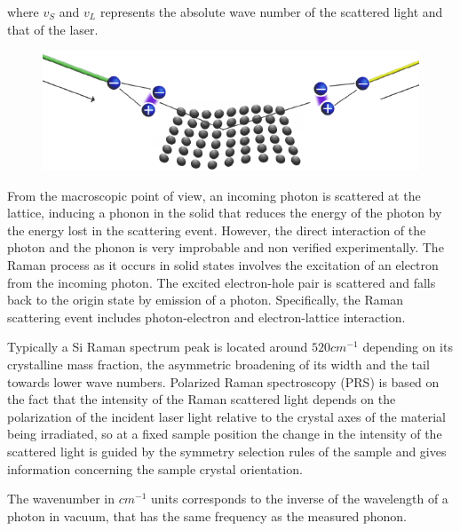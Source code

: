 \documentclass[openany,11pt,a4paper]{report}
\begin{document}
where $v_{S}$ and $v_{L}$ represents the absolute wave number of the scattered light and that of the laser.

\begin{figure}[H]
\centering
\includegraphics[scale=0.8]{solid.PNG}
\caption{\cite{phonons}}
\end{figure}



From the macroscopic point of view, an incoming photon is scattered at the lattice, inducing a phonon in the solid that reduces the energy of the photon by the energy lost in the scattering event. However, the direct interaction of the photon and the phonon is very improbable and non verified experimentally. The Raman process as it occurs in solid states involves the excitation of an electron from the incoming photon. The excited electron-hole pair is scattered and falls back to the origin state by
emission of a photon. Specifically, the Raman scattering event includes photon-electron and electron-lattice interaction. 


\cite{phonons}










Typically a Si Raman spectrum peak is located around $520 cm^{-1}$ depending on its
crystalline mass fraction, the asymmetric broadening of its width and the tail towards lower wave
numbers. Polarized Raman spectroscopy (PRS) is based on the
fact that the intensity of the Raman scattered light depends on the polarization of the incident laser
light relative to the crystal axes of the material being irradiated, so at a fixed sample position the change in the intensity of the scattered light is guided by the
symmetry selection rules of the sample and gives information concerning the sample crystal
orientation. \cite{sos}







The wavenumber in $cm^{-1}$ units corresponds to the inverse of the wavelength of a photon in vacuum, that has the same frequency as the measured phonon.
\end{document}
